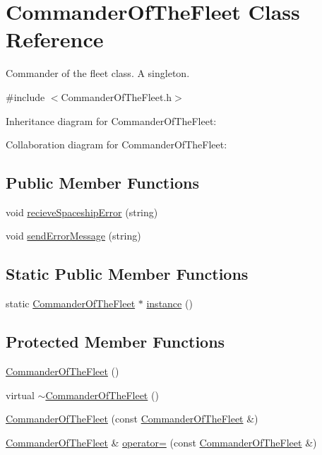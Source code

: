 \hypertarget{classCommanderOfTheFleet}{}\section{Commander\+Of\+The\+Fleet Class Reference}
\label{classCommanderOfTheFleet}


Commander of the fleet class. A singleton.  




{\ttfamily \#include $<$Commander\+Of\+The\+Fleet.\+h$>$}



Inheritance diagram for Commander\+Of\+The\+Fleet\+:


Collaboration diagram for Commander\+Of\+The\+Fleet\+:
\subsection*{Public Member Functions}
\begin{DoxyCompactItemize}
\item 
void \hyperlink{classCommanderOfTheFleet_a13e91b9342df067b375f7ef2b929c0d5}{recieve\+Spaceship\+Error} (string)
\item 
void \hyperlink{classCommanderOfTheFleet_a39cfd5c0016355543515e919791d7984}{send\+Error\+Message} (string)
\end{DoxyCompactItemize}
\subsection*{Static Public Member Functions}
\begin{DoxyCompactItemize}
\item 
static \hyperlink{classCommanderOfTheFleet}{Commander\+Of\+The\+Fleet} $\ast$ \hyperlink{classCommanderOfTheFleet_a19e2583c1a60a01f5530b0f97fbcbca5}{instance} ()
\end{DoxyCompactItemize}
\subsection*{Protected Member Functions}
\begin{DoxyCompactItemize}
\item 
\hyperlink{classCommanderOfTheFleet_a8b61f0fbb16d5e8cbeda75d931b271c6}{Commander\+Of\+The\+Fleet} ()
\item 
virtual \hyperlink{classCommanderOfTheFleet_a63fcb504fd7d5dc035814bc137875cd2}{$\sim$\+Commander\+Of\+The\+Fleet} ()
\item 
\hyperlink{classCommanderOfTheFleet_a83cb8584c7f588f533bc33ed0168188b}{Commander\+Of\+The\+Fleet} (const \hyperlink{classCommanderOfTheFleet}{Commander\+Of\+The\+Fleet} \&)
\item 
\hyperlink{classCommanderOfTheFleet}{Commander\+Of\+The\+Fleet} \& \hyperlink{classCommanderOfTheFleet_aaa476181b99052293306fcfe57dfd642}{operator=} (const \hyperlink{classCommanderOfTheFleet}{Commander\+Of\+The\+Fleet} \&)
\end{DoxyCompactItemize}
